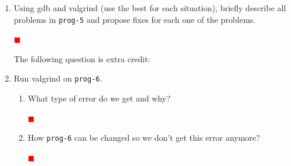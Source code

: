 \documentclass[12pt]{article}
\newcounter{problem}
\newenvironment{solution}{\par\textcolor{green!50!black}\bgroup}{\egroup\par}
\newcommand{\TODO}{\textcolor{red}{$\blacksquare$}}
\begin{document}
\begin{enumerate}
\item Using gdb and valgrind (use the best for each situation), briefly describe
  all problems in \texttt{prog-5} and propose fixes for each one of the
  problems.
  \begin{solution}
  \textbf{\textcolor{red}{\TODO}}
  \end{solution}

\pagebreak
The following question is extra credit:

\item Run valgrind on \texttt{prog-6}.
\begin{enumerate}
\item What type of error do we get and why?
  \begin{solution}
  \textbf{\textcolor{red}{\TODO}}
  \end{solution}
\item How \texttt{prog-6} can be changed so we don't get this error anymore?
  \begin{solution}
  \textbf{\textcolor{red}{\TODO}}
  \end{solution}
\end{enumerate}




\end{enumerate}
\end{document}
